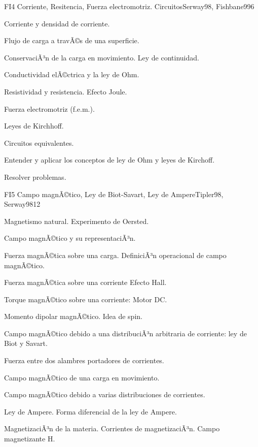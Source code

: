 \begin{syllabus}
\begin{unit}{FI4 Corriente, Resitencia, Fuerza electromotriz. Circuitos}{Serway98, Fishbane99}{6}
   \begin{topics}
         \item  Corriente y densidad de corriente.
	 \item  Flujo de carga a travÃ©s de una superficie.
         \item  ConservaciÃ³n de la carga en movimiento. Ley de continuidad.
	 \item  Conductividad elÃ©ctrica y la ley de Ohm.
         \item  Resistividad y resistencia.  Efecto Joule.
	 \item  Fuerza electromotriz (f.e.m.).
         \item  Leyes de Kirchhoff.
	 \item  Circuitos equivalentes.
   \end{topics}

   \begin{unitgoals}
         \item  Entender y aplicar los conceptos de ley de Ohm y leyes de Kirchoff.
         \item  Resolver problemas.
   \end{unitgoals}
\end{unit}

\begin{unit}{FI5 Campo magnÃ©tico, Ley de Biot-Savart, Ley de Ampere}{Tipler98, Serway98}{12}
   \begin{topics}
         \item  Magnetismo natural. Experimento de Oersted.
	 \item  Campo magnÃ©tico y su representaciÃ³n.
         \item  Fuerza magnÃ©tica sobre una carga. DefiniciÃ³n operacional de campo magnÃ©tico.
	 \item  Fuerza magnÃ©tica sobre una corriente  Efecto Hall.
         \item  Torque magnÃ©tico sobre una corriente: Motor DC.
	 \item  Momento dipolar magnÃ©tico.  Idea de spin.
         \item  Campo magnÃ©tico debido a una distribuciÃ³n arbitraria de corriente:  ley de Biot y Savart.
	 \item  Fuerza entre dos alambres portadores de corrientes.
         \item  Campo magnÃ©tico de una carga en movimiento.
	 \item  Campo magnÃ©tico debido a varias distribuciones de corrientes.
         \item  Ley de Ampere.  Forma diferencial de la ley de Ampere.
	 \item  MagnetizaciÃ³n de la materia. Corrientes de magnetizaciÃ³n. Campo magnetizante H.
   \end{topics}


\end{unit}
\end{syllabus}
